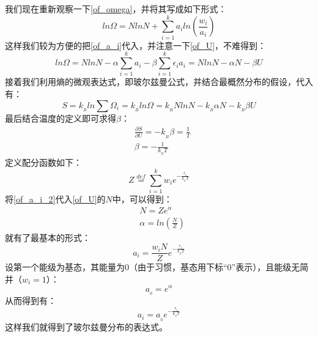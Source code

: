 \begin{prove}
            我们现在重新观察一下\ref{of_omega}，并将其写成如下形式：
            \begin{equation}
                ln\Omega = NlnN + \sum_{i = 1}^{k} a_i ln(\frac{w_i}{a_i})
            \end{equation}
            这样我们较为方便的把\ref{of_a_i}代入，并注意一下\ref{of_U}，不难得到：
            \begin{equation}
                ln\Omega = NlnN - \alpha \sum_{i = 1}^{k} a_i -\beta \sum_{i = 1}^{k}\epsilon_i a_i = NlnN -\alpha N - \beta U  
            \end{equation}
            接着我们利用熵的微观表达式，即玻尔兹曼公式，并结合最概然分布的假设，代入有：
            \begin{equation}
                S = k_{_B}ln\sum \Omega_i = k_{_B}ln\Omega =  k_{_B}NlnN -k_{_B}\alpha N - k_{_B}\beta U
                \label{of_S}
            \end{equation}
            最后结合温度的定义即可求得$\beta$：
            \begin{equation}
                \begin{aligned}
                    &\frac{\partial S}{\partial U} = -k_{_B}\beta =\frac{1}{T}\\
                    &\beta = -\frac{1}{k_{_B}T}
                \end{aligned}
            \end{equation}
            定义配分函数如下：
            \begin{equation}
                Z \overset{def}{=} \sum_{i=1}^{k}w_i e^{-\frac{\epsilon_i}{k_{_B}T}}
            \end{equation}
            将\ref{of_a_i_2}代入\ref{of_U}的$N$中，可以得到：
            \begin{equation}
                \begin{aligned}
                    &N = Ze^{\alpha} \\
                    &\alpha = ln\left(\frac{N}{Z}\right)
                \end{aligned}
            \end{equation}
            就有了最基本的形式：
            \begin{equation}
                a_i = \frac{w_{i}N}{Z} e^{-\frac{\epsilon_i}{k_{_B}T}}
                \label{of_a_i_3}
            \end{equation}
            设第一个能级为基态，其能量为0（由于习惯，基态用下标“0”表示），且能级无简并（$w_i=1$）：
            \begin{equation}
                a_{_0} = e^{\alpha}
            \end{equation}
            从而得到有：
            \begin{equation}
                a_i = a_{_0} e^{-\frac{\epsilon_i}{k_{_B}T}} 
            \end{equation}
            这样我们就得到了玻尔兹曼分布的表达式。
        \end{prove}

